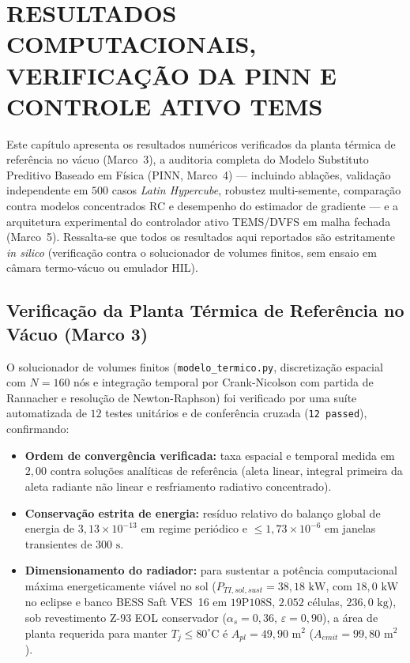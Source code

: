 \newpage
\section{RESULTADOS COMPUTACIONAIS, VERIFICAÇÃO DA PINN E CONTROLE ATIVO TEMS}
\label{cap:resultados}

Este capítulo apresenta os resultados numéricos verificados da planta térmica de referência no vácuo (Marco~3), a auditoria completa do Modelo Substituto Preditivo Baseado em Física (PINN, Marco~4) — incluindo ablações, validação independente em $500$ casos \textit{Latin Hypercube}, robustez multi-semente, comparação contra modelos concentrados RC e desempenho do estimador de gradiente — e a arquitetura experimental do controlador ativo TEMS/DVFS em malha fechada (Marco~5). Ressalta-se que todos os resultados aqui reportados são estritamente \textit{in silico} (verificação contra o solucionador de volumes finitos, sem ensaio em câmara termo-vácuo ou emulador HIL).

\subsection{Verificação da Planta Térmica de Referência no Vácuo (Marco 3)}
\label{sec:resultados_marco3}

O solucionador de volumes finitos (\texttt{modelo\_termico.py}, discretização espacial com $N=160$ nós e integração temporal por Crank-Nicolson com partida de Rannacher e resolução de Newton-Raphson) foi verificado por uma suíte automatizada de $12$ testes unitários e de conferência cruzada (\texttt{12 passed}), confirmando:
\begin{itemize}
    \item \textbf{Ordem de convergência verificada:} taxa espacial e temporal medida em $2{,}00$ contra soluções analíticas de referência (aleta linear, integral primeira da aleta radiante não linear e resfriamento radiativo concentrado).
    \item \textbf{Conservação estrita de energia:} resíduo relativo do balanço global de energia de $3{,}13 \times 10^{-13}$ em regime periódico e $\le 1{,}73 \times 10^{-6}$ em janelas transientes de $300\text{ s}$.
    \item \textbf{Dimensionamento do radiador:} para sustentar a potência computacional máxima energeticamente viável no sol ($P_{TI,sol,sust} = 38{,}18\text{ kW}$, com $18{,}0\text{ kW}$ no eclipse e banco BESS Saft VES~16 em $19\text{P}108\text{S}$, $2.052$ células, $236{,}0\text{ kg}$), sob revestimento Z-93 EOL conservador ($\alpha_s = 0{,}36$, $\varepsilon = 0{,}90$), a área de planta requerida para manter $T_j \le 80^\circ\text{C}$ é $A_{pl} = 49{,}90\text{ m}^2$ ($A_{emit} = 99{,}80\text{ m}^2$).
\end{itemize}

